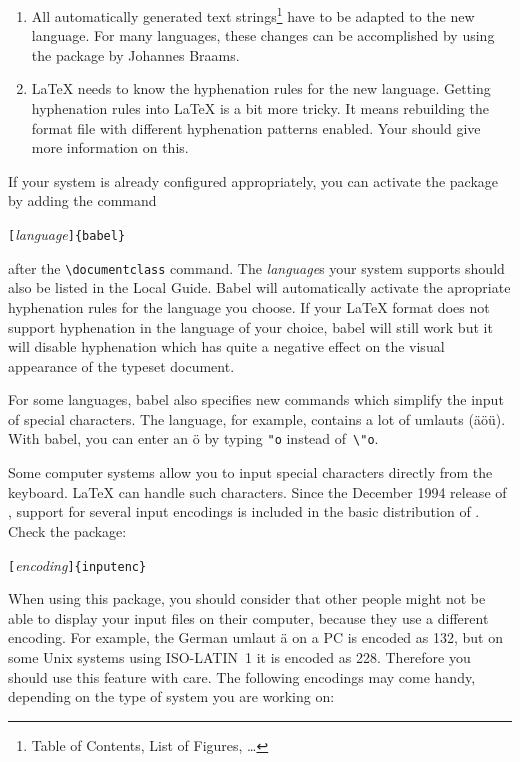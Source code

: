 \begin{enumerate}
\item All automatically generated text strings\footnote{Table of
    Contents, List of Figures, \ldots} have to be adapted to the new
  language.  For many languages, these changes can be accomplished by
  using the  package by Johannes Braams.
\item \LaTeX{} needs to know the hyphenation rules for the new
  language. Getting hyphenation rules into \LaTeX{} is a bit more
  tricky. It means rebuilding the format file with different
  hyphenation patterns enabled. Your \guide{} should give more
  information on this.
\end{enumerate}

If your system is already configured appropriately, you can activate
the  package by adding the command
\begin{lscommand}
\verb|[|\emph{language}\verb|]{babel}| 
\end{lscommand}
\noindent after the \verb|\documentclass| command. The \emph{language}s your
system supports should also be listed in the Local Guide. Babel will
automatically activate the apropriate hyphenation rules for the
language you choose. If your \LaTeX{} format does not support
hyphenation in the language of your choice, babel will still work but
it will disable hyphenation which has quite a negative effect on the
visual appearance of the typeset document.

For some languages, \textsf{babel} also specifies new commands which
simplify the input of special characters. The  language, for
example, contains a lot of umlauts (\"a\"o\"u).  With \textsf{babel},
you can enter an \"o by typing \verb|"o| instead of~\verb|\"o|.

Some computer systems allow you to input special characters directly
from the keyboard. \LaTeX{} can handle such characters. Since the
December 1994 release of \LaTeXe{}, support for several input
encodings is included in the basic distribution of \LaTeXe. Check the
 package:
\begin{lscommand}
\verb|[|\emph{encoding}\verb|]{inputenc}| 
\end{lscommand}

When using this package, you should consider
that other people might not be able to display your input files on
their computer, because they use a different encoding. For example,
the German umlaut \"a on a PC is encoded as 132, but on some Unix
systems using ISO-LATIN~1 it is encoded as 228. Therefore you should
use this feature with care. The following encodings may come handy,
depending on the type of system you are working on: 

